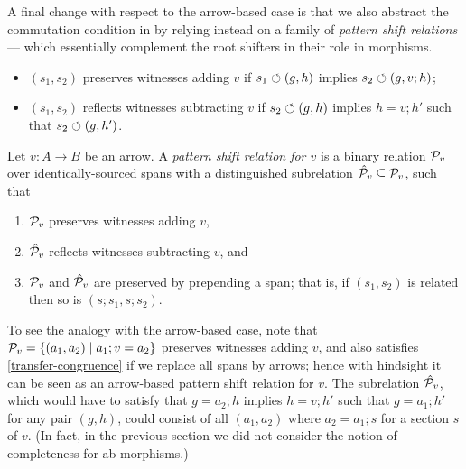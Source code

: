 A final change with respect to the arrow-based case is that we also abstract the commutation condition in  by relying instead on a family of \emph{pattern shift relations} --- which essentially complement the root shifters in their role in morphisms.

\begin{itemize}
\item $(s_1,s_2)$ preserves witnesses adding $v$ if $s_1\circlearrowleft (g,h)$ implies $s_2\circlearrowleft (g,v;h)$;
\item $(s_1,s_2)$ reflects witnesses subtracting $v$ if $s_2\circlearrowleft (g,h)$ implies $h=v;h'$ such that $s_2\circlearrowleft (g,h')$.
\end{itemize}

\begin{definition}
Let $v:A\to B$ be an arrow. A \emph{pattern shift relation for $v$} is a binary relation $\mathcal{P}_v$ over identically-sourced spans with a distinguished subrelation $\hat{\mathcal{P}}_v\subseteq \mathcal{P}_v$, such that 
%
\begin{enumerate}[label=(\roman*)]
\item\label{transfer-preserves} $\mathcal{P}_v$ preserves witnesses adding $v$,
\item\label{transfer-complete} $\hat{\mathcal{P}}_v$ reflects witnesses subtracting $v$, and
\item\label{transfer-congruence} $\mathcal{P}_v$ and $\hat{\mathcal{P}}_v$ are preserved by prepending a span; that is, if $(s_1,s_2)$ is related then so is $(s;s_1,s;s_2)$.
\end{enumerate}
\end{definition}
%
To see the analogy with the arrow-based case, note that $\mathcal{P}_v=\{{(a_1,a_2)\mid a_1;v=a_2}\}$ preserves witnesses adding $v$, and also satisfies \ref{transfer-congruence} if we replace all spans by arrows; hence with hindsight it can be seen as an arrow-based pattern shift relation for $v$. The subrelation $\hat{\mathcal{P}}_v$, which would have to satisfy that $g=a_2;h$ implies $h=v;h'$ such that $g=a_1;h'$ for any pair $(g,h)$, could consist of all $(a_1,a_2)$ where $a_2=a_1;s$ for a section $s$ of $v$. (In fact, in the previous section we did not consider the notion of completeness for ab-morphisms.)
%
